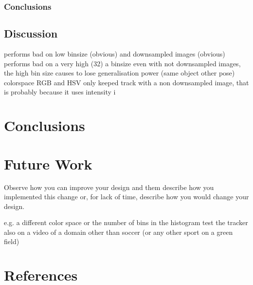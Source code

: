 \documentclass[a4paper,11pt]{article}
\begin{document}
\subsubsection{Conclusions}

\subsection{Discussion} %
performs bad on low binsize (obvious) and downsampled images (obvious)\\

performs bad on a very high (32) a binsize even with not downsampled
images, the high bin size causes to lose generalisation power (same object other pose)\\
		
colorspace RGB and HSV only keeped track with a non downsampled image,
that is probably because it uses intensity i


\section{Conclusions} \label{sec:conc}
\section{Future Work} \label{sec:fut}
Observe how you can improve your design and them describe how you implemented this change or, for lack of time, describe how you would change your design. 

e.g. a different color space or the number of bins in the histogram
test the tracker also on a video of a domain other than soccer (or any other sport on a green field)





\section{References} 


\renewcommand\bibname{References}


\end{document}
